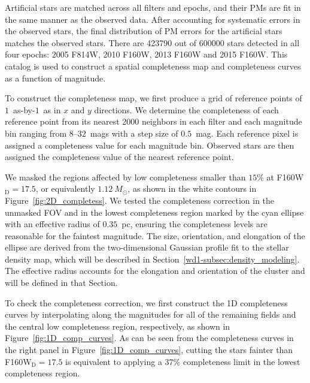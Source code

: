 \documentclass[12pt]{ucsddissertation}
\begin{document}
\begin{CJK*}{UTF8}{gbsn}
Artificial stars are matched across all filters and epochs, and their PMs are fit in the same manner as the observed data. After accounting for systematic errors in the observed stars, the final distribution of PM errors for the artificial stars matches the observed stars. There are \num{423790} out of \num{600000} stars detected in all four epochs: 2005 F814W, 2010 F160W, 2013 F160W and 2015 F160W. This catalog is used to construct a spatial completeness map and completeness curves as a function of magnitude.

To construct the completeness map, we first produce a grid of reference points of $1$~as-by-$1$~as in $x$ and $y$ directions. We determine the completeness of each reference point from its nearest \num{2000} neighbors in each filter and each magnitude bin ranging from $8$--$32$~mags with a step size of $0.5$~mag. Each reference pixel is assigned a completeness value for each magnitude bin. Observed stars are then assigned the completeness value of the nearest reference point. 

We masked the regions affected by low completeness smaller than $15\%$ at F160W$_\mathrm{D}=17.5$, or equivalently $1.12~M_\odot$, as shown in the white contours in Figure~\ref{fig:2D_completess}.  We tested the completeness correction in the unmasked FOV and in the lowest completeness region marked by the cyan ellipse with an effective radius of $0.35$~pc, ensuring the completeness levels are reasonable for the faintest magnitude. The size, orientation, and elongation of the ellipse are derived from the two-dimensional Gaussian profile fit to the stellar density map, which will be described in Section~\ref{wd1-subsec:density_modeling}. The effective radius accounts for the elongation and orientation of the cluster and will be defined in that Section.


To check the completeness correction, we first construct the 1D completeness curves by interpolating along the magnitudes for all of the remaining fields and the central low completeness region, respectively, as shown in Figure~\ref{fig:1D_comp_curves}. As can be seen from the completeness curves in the right panel in Figure~\ref{fig:1D_comp_curves}, cutting the stars fainter than F160W$_\mathrm{D}=17.5$ is equivalent to applying a $37\%$ completeness limit in the lowest completeness region.


\end{CJK*}
\end{document}
